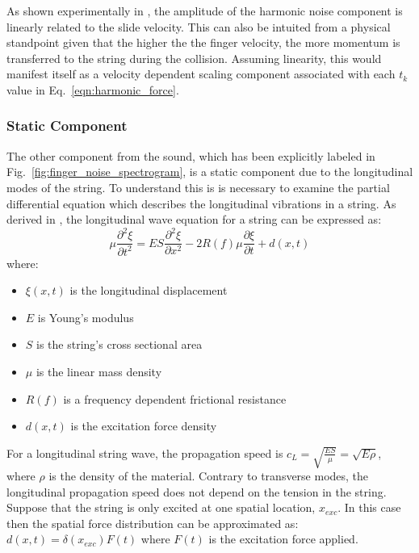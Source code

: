 \documentclass[main.tex]{subfiles}
\begin{document}
As shown experimentally in , the amplitude of the harmonic noise component is linearly related to the slide velocity. This can also be intuited from a physical standpoint given that the higher the the finger velocity, the more momentum is transferred to the string during the collision. Assuming linearity, this would manifest itself as a velocity dependent scaling component associated with each $t_k$ value in Eq.~\ref{eqn:harmonic_force}.

\subsubsection{Static Component}
The other component from the sound, which has been explicitly labeled in Fig.~\ref{fig:finger_noise_spectrogram}, is a static component due to the longitudinal modes of the string. To understand this is is necessary to examine the partial differential equation which describes the longitudinal vibrations in a string. As derived in , the longitudinal wave equation for a string can be expressed as:
\begin{equation}
    \mu \frac{\partial^2 \xi}{\partial t^2} = ES\frac{\partial^2 \xi}{\partial x^2} - 2R(f)\mu \frac{\partial \xi}{\partial t} + d(x,t)
    \label{eqn:longitudinal_PDE}
\end{equation}
where:
\begin{itemize}
    \item $\xi(x,t)$ is the longitudinal displacement
    \item $E$ is Young's modulus
    \item $S$ is the string's cross sectional area
    \item $\mu$ is the linear mass density
    \item $R(f)$ is a frequency dependent frictional resistance
    \item $d(x,t)$ is the excitation force density
\end{itemize}

For a longitudinal string wave, the propagation speed is $c_L = \sqrt{\frac{ES}{\mu}} = \sqrt{E \rho}$, where $\rho$ is the density of the material. Contrary to transverse modes, the longitudinal propagation speed does not depend on the tension in the string. Suppose that the string is only excited at one spatial location, $x_{exc}$. In this case then the spatial force distribution can be approximated as: $d(x,t) = \delta(x_{exc})F(t)$ where $F(t)$ is the excitation force applied.
\end{document}

